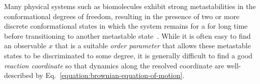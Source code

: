 \documentclass[aps,prl,twocolumn,superscriptaddress,floatfix]{revtex4-1}
\begin{document}
Many physical systems such as biomolecules exhibit strong metastabilities in the conformational degrees of freedom, resulting in the presence of two or more discrete conformational states in which the system remains for a for long time before transitioning to another metastable state~\cite{schuette-huisinga:2003:metastable-states}.
While it is often easy to find an observable $x$ that is a suitable \emph{order parameter} that allows these metastable states to be discriminated to some degree, it is generally difficult to find a good \emph{reaction coordinate} so that dynamics along the resolved coordinate are well-described by Eq.~\ref{equation:brownian-equation-of-motion}.


\end{document}
